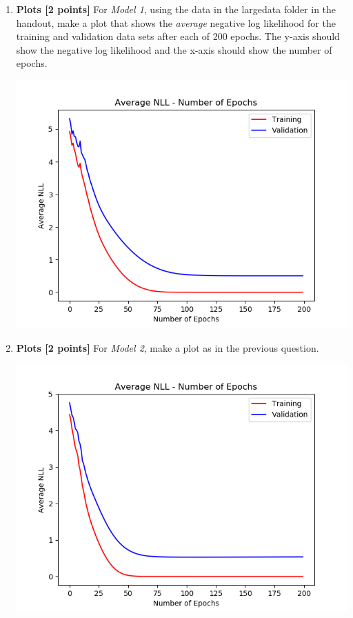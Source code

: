 \documentclass[11pt]{article}
\numberwithin{equation}{section} %
\numberwithin{figure}{section} %
\numberwithin{table}{section} %
\begin{document}
\begin{enumerate}
    
\item {\bf Plots [2 points]} 
For \emph{Model 1}, using the data in the largedata folder in the handout, make a plot that shows the \textit{average} negative log likelihood for the training and validation data sets after each of 200 epochs. The y-axis should show the negative log likelihood and the x-axis should show the number of epochs.  

\begin{solution}
    \includegraphics[scale=0.8]{model1}
\end{solution}

\item {\bf Plots [2 points]} 
For \emph{Model 2}, make a plot as in the previous question.
        
\begin{solution}
    \includegraphics[scale=0.8]{model2}
\end{solution}
\clearpage



\end{enumerate}
\end{document}
